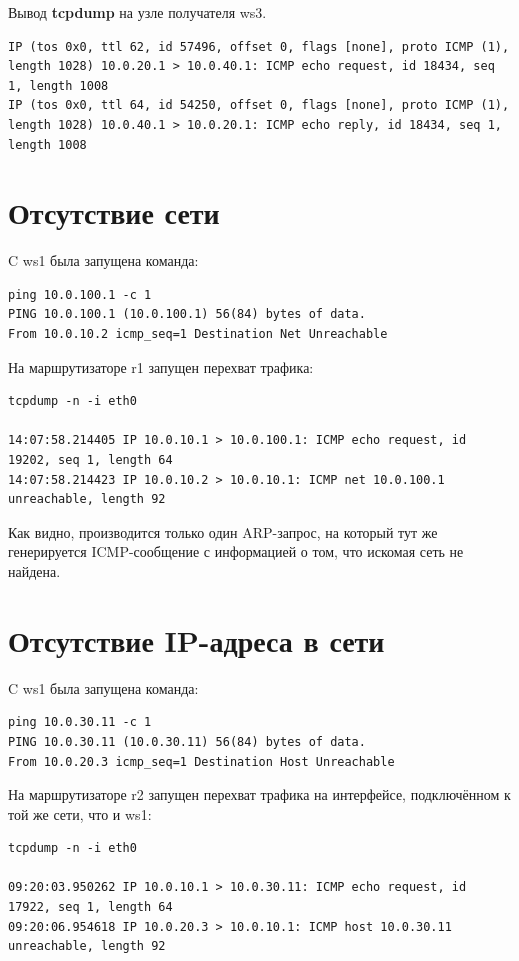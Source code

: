 \documentclass[a4paper,12pt]{article}
\begin{document}
Вывод \textbf{tcpdump} на узле получателя ws3.

\begin{Verbatim}
IP (tos 0x0, ttl 62, id 57496, offset 0, flags [none], proto ICMP (1), length 1028) 10.0.20.1 > 10.0.40.1: ICMP echo request, id 18434, seq 1, length 1008
IP (tos 0x0, ttl 64, id 54250, offset 0, flags [none], proto ICMP (1), length 1028) 10.0.40.1 > 10.0.20.1: ICMP echo reply, id 18434, seq 1, length 1008
\end{Verbatim}


\section{Отсутствие сети}

C ws1 была запущена команда:

\begin{Verbatim}
ping 10.0.100.1 -c 1
PING 10.0.100.1 (10.0.100.1) 56(84) bytes of data.
From 10.0.10.2 icmp_seq=1 Destination Net Unreachable
\end{Verbatim}

 На маршрутизаторе r1 запущен перехват трафика:
 
\begin{Verbatim}
tcpdump -n -i eth0

14:07:58.214405 IP 10.0.10.1 > 10.0.100.1: ICMP echo request, id 19202, seq 1, length 64
14:07:58.214423 IP 10.0.10.2 > 10.0.10.1: ICMP net 10.0.100.1 unreachable, length 92
\end{Verbatim}

Как видно, производится только один ARP-запрос, на который тут же генерируется ICMP-сообщение с информацией о том, что искомая сеть не найдена.

\section{Отсутствие IP-адреса в сети}

C ws1 была запущена команда:

\begin{Verbatim}
ping 10.0.30.11 -c 1
PING 10.0.30.11 (10.0.30.11) 56(84) bytes of data.
From 10.0.20.3 icmp_seq=1 Destination Host Unreachable
\end{Verbatim}

На маршрутизаторе r2 запущен перехват трафика на интерфейсе, подключённом к той же сети, что и ws1:

\begin{Verbatim}
tcpdump -n -i eth0

09:20:03.950262 IP 10.0.10.1 > 10.0.30.11: ICMP echo request, id 17922, seq 1, length 64
09:20:06.954618 IP 10.0.20.3 > 10.0.10.1: ICMP host 10.0.30.11 unreachable, length 92
\end{Verbatim}
\end{document}
